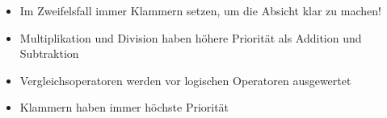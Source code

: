 \begin{achtung}
	\begin{itemize}
		\item Im Zweifelsfall immer Klammern setzen, um die Absicht klar zu machen!
		\item Multiplikation und Division haben höhere Priorität als Addition und Subtraktion
		\item Vergleichsoperatoren werden vor logischen Operatoren ausgewertet
		\item Klammern haben immer höchste Priorität
	\end{itemize}
\end{achtung}
